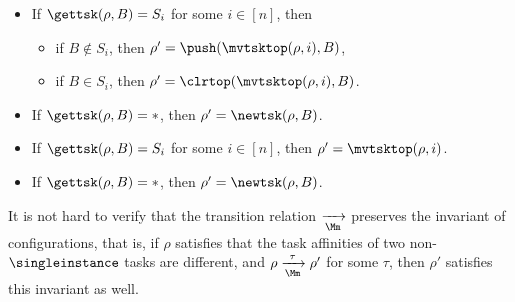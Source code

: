 	\noindent {}
	\begin{itemize}
		\item If $\gettsk(\rho, B) = S_i$ for some $i\in[n]$, then
		\begin{itemize}
			\item if $B \not \in S_i$, then $\rho' = \push(\mvtsktop(\rho, i), B)$,
			\item if $B  \in S_i$, 	then $\rho' =  \clrtop(\mvtsktop(\rho, i), B)$.
		\end{itemize}
		\item If $\gettsk(\rho, B) = *$, then $\rho' = \newtsk(\rho, B)$.
	\end{itemize}
	
	\noindent {}
	\begin{itemize}
		\item If $\gettsk(\rho, B) = S_i$ for some $i \in [n]$, then $\rho' = \mvtsktop(\rho, i)$.
		\item If $\gettsk(\rho, B) = *$, then $\rho' = \newtsk(\rho, B)$.
	\end{itemize}
	It is not hard to verify that the transition relation $\xrightarrow[\Mm]{}$ preserves the invariant of configurations, that is, if $\rho$ satisfies that the task affinities of two non-$\singleinstance$ tasks are different, and $\rho \xrightarrow[\Mm]{\tau} \rho'$ for some $\tau$, then $\rho'$ satisfies this invariant as well. 
	
